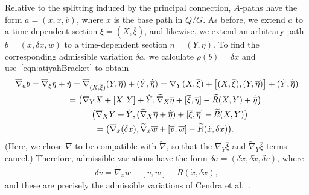 \documentclass[10pt,a4paper]{amsart}
\numberwithin{equation}{section}
\begin{document}
 Relative to the splitting induced by the principal connection, $A$-paths have the form $ a = ( x, \dot{x} , \overline{ v } ) $, where $x$ is the base path in $ Q / G $. As before, we extend $a$ to a time-dependent section $ \xi = ( X, \overline{ \xi } ) $, and likewise, we extend an arbitrary path $b = ( x, \delta x , \overline{ w } ) $ to a time-dependent section $ \eta = ( Y, \overline{ \eta } ) $. To f\/ind the corresponding admissible variation $ \delta a $, we calculate $ \rho (b) = \delta x $ and use~\eqref{eqn:atiyahBracket} to obtain
 \begin{gather*}
 \overline{ \nabla } _a b = \overline{ \nabla } _\xi \eta + \dot{ \eta }
= \overline{ \nabla } _{ ( X, \overline{ \xi } ) } ( Y, \overline{ \eta } ) + ( \dot{ Y }, \dot{ \overline{ \eta } } ) = \nabla _Y ( X, \overline{ \xi } ) + \bigl[ ( X, \overline{ \xi } ), (Y, \overline{ \eta } ) \bigr] + ( \dot{ Y } , \dot{ \overline{ \eta } } ) \\
\hphantom{\overline{ \nabla } _a b}{} = \bigl( \nabla _Y X + [ X, Y ] + \dot{ Y } , \widetilde{ \nabla } _X \overline{ \eta } + [ \overline{ \xi }, \overline{ \eta } ] - \widetilde{ R } ( X, Y ) + \dot{ \overline{ \eta } } \bigr) \\
\hphantom{\overline{ \nabla } _a b}{}= \bigl( \overline{ \nabla } _X Y + \dot{ Y } , (\widetilde{ \nabla } _X \overline{ \eta } + \dot{ \overline{ \eta } }) + [ \overline{ \xi }, \overline{ \eta } ] - \widetilde{ R } ( X, Y ) \bigr) \\
\hphantom{\overline{ \nabla } _a b}{} = \bigl( \overline{ \nabla } _{ \dot{x} } (\delta x) , \widetilde{ \nabla } _{\dot{x}} \overline{ w } + [ \overline{ v }, \overline{ w } ] - \widetilde{ R } ( \dot{x}, \delta x ) \bigr).
 \end{gather*}
 (Here, we chose $ \nabla $ to be compatible with $ \widetilde{ \nabla } $, so that the $ \nabla _Y \overline{ \xi } $ and $ \widetilde{ \nabla } _Y \overline{ \xi } $ terms cancel.) Therefore, admissible variations have the form $ \delta a = ( \delta x, \delta \dot{x}, \delta \overline{ v } ) $, where
 \begin{gather*}
 \delta \overline{ v } = \widetilde{ \nabla } _{\dot{x}} \overline{ w } + [ \overline{ v }, \overline{ w } ] - \widetilde{ R } ( \dot{x}, \delta x ) ,
 \end{gather*}
 and these are precisely the admissible variations of Cendra et al.~\cite[Theorem~3.4.1]{CeMaRa2001}.
\end{document}
